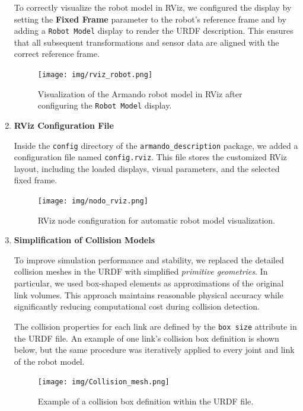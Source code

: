 \documentclass{article}
\begin{document}
\begin{enumerate}
\vspace{0.5em}
\noindent To correctly visualize the robot model in RViz, we configured the display by setting the \textbf{Fixed Frame} parameter 
to the robot’s reference frame and by adding a \lstinline{Robot Model} display to render the URDF description. 
This ensures that all subsequent transformations and sensor data are aligned with the correct reference frame.

\begin{figure}[h]
    \centering
    \texttt{[image: img/rviz\_robot.png]}
    \caption{Visualization of the Armando robot model in RViz after configuring the \texttt{Robot Model} display.}
    \label{fig:rviz_robot}
\end{figure}

\item \textbf{RViz Configuration File}

\noindent Inside the \lstinline{config} directory of the \lstinline{armando_description} package, 
we added a configuration file named \lstinline{config.rviz}. This file stores the customized RViz layout, 
including the loaded displays, visual parameters, and the selected fixed frame. 

\begin{figure}[h]
    \centering
    \texttt{[image: img/nodo\_rviz.png]}
    \caption{RViz node configuration for automatic robot model visualization.}
    \label{fig:nodo_rviz}
\end{figure}

\item \textbf{Simplification of Collision Models}

\noindent To improve simulation performance and stability, we replaced the detailed collision meshes in the URDF 
with simplified \textit{primitive geometries}. In particular, we used box-shaped elements as approximations of 
the original link volumes. This approach maintains reasonable physical accuracy while significantly reducing 
computational cost during collision detection.

\vspace{0.5em}
\noindent The collision properties for each link are defined by the \lstinline{box size} attribute in the URDF file. 
An example of one link’s collision box definition is shown below, but the same procedure was iteratively applied 
to every joint and link of the robot model.

\begin{figure}[H]
    \centering
    \texttt{[image: img/Collision\_mesh.png]}
    \caption{Example of a collision box definition within the URDF file.}
    \label{fig:Collision_mesh}
\end{figure}


\end{enumerate}
\end{document}
